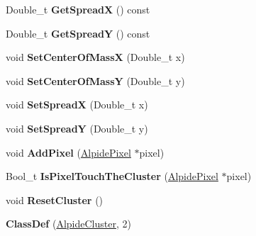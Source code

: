 \begin{DoxyCompactItemize}
\mbox{\label{class_alpide_cluster_ac32c99edeb62efba4431fe74ea07df6f}} 
Double\+\_\+t {\bfseries Get\+SpreadX} () const
\item 
\mbox{\label{class_alpide_cluster_a6d567c91d25d698075c267d96f5c83e6}} 
Double\+\_\+t {\bfseries Get\+SpreadY} () const
\item 
\mbox{\label{class_alpide_cluster_a2a5250947ca4f2505c156fa8755a72c1}} 
void {\bfseries Set\+Center\+Of\+MassX} (Double\+\_\+t x)
\item 
\mbox{\label{class_alpide_cluster_a24326db8f7e7a36f46523f4031c3c995}} 
void {\bfseries Set\+Center\+Of\+MassY} (Double\+\_\+t y)
\item 
\mbox{\label{class_alpide_cluster_acc51c586b7d86dd19e1fe7f0842901e7}} 
void {\bfseries Set\+SpreadX} (Double\+\_\+t x)
\item 
\mbox{\label{class_alpide_cluster_ac41e6bb51f42f81da59a3e0a4d83a91a}} 
void {\bfseries Set\+SpreadY} (Double\+\_\+t y)
\item 
\mbox{\label{class_alpide_cluster_a8fb86aad62f5e9bcdfdf70ccf0512ed0}} 
void {\bfseries Add\+Pixel} (\mbox{\hyperlink{class_alpide_pixel}{Alpide\+Pixel}} $\ast$pixel)
\item 
\mbox{\label{class_alpide_cluster_adde177ceced7edb8b8ecde3c05043186}} 
Bool\+\_\+t {\bfseries Is\+Pixel\+Touch\+The\+Cluster} (\mbox{\hyperlink{class_alpide_pixel}{Alpide\+Pixel}} $\ast$pixel)
\item 
\mbox{\label{class_alpide_cluster_a37055d9d43c3961a6439d56bbfe7d4c3}} 
void {\bfseries Reset\+Cluster} ()
\item 
\mbox{\label{class_alpide_cluster_ad7daeae5887cd6598afa9da94e06c1b2}} 
{\bfseries Class\+Def} (\mbox{\hyperlink{class_alpide_cluster}{Alpide\+Cluster}}, 2)
\end{DoxyCompactItemize}
